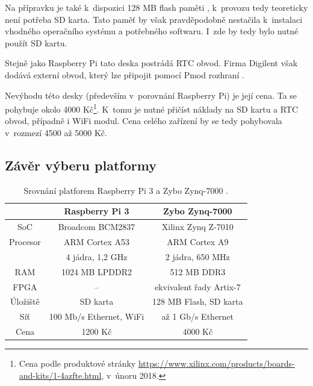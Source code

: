 Na přípravku je také k~dispozici 128 MB flash paměti \cite{zybo_man}, k~provozu tedy teoreticky není potřeba SD karta. Tato paměť by však pravděpodobně nestačila k~instalaci vhodného operačního systému a potřebného softwaru. I~zde by tedy bylo nutné použít SD kartu.

Stejně jako Raspberry Pi tato deska postrádá RTC obvod. Firma Digilent však dodává externí obvod, který lze připojit pomocí Pmod rozhraní \cite{pmod_rtc_man}. 

Nevýhodu této desky (především v~porovnání Raspberry Pi) je její cena. Ta se pohybuje okolo 4000 Kč\footnote{Cena podle produktové stránky \url{https://www.xilinx.com/products/boards-and-kits/1-4azfte.html}, v~únoru 2018.}. K~tomu je nutné přičíst náklady na SD kartu a RTC obvod, případně i WiFi modul. Cena celého zařízení by se tedy pohybovala v~rozmezí 4500 až 5000 Kč.


\subsection{Závěr výberu platformy}

\begin{table}[h!]
\centering
\begin{tabular}{|c | c | c |} 
 \hline
 & \textbf{Raspberry Pi 3} & \textbf{Zybo Zynq-7000} \\
 \hline 
 SoC & Broadcom BCM2837 & Xilinx Zynq Z-7010 \\ 
 Procesor & ARM Cortex A53 & ARM Cortex A9 \\
 & 4 jádra, 1,2 GHz & 2 jádra, 650 MHz \\
 RAM & 1024 MB LPDDR2 & 512 MB DDR3 \\
 FPGA & -- & ekvivalent řady Artix-7 \\
 Úložiště & SD karta & 128 MB Flash, SD karta \\
 Síť & 100 Mb/s Ethernet, WiFi & až 1 Gb/s Ethernet \\
 Cena & 1200 Kč & 4000 Kč \\
 \hline
\end{tabular}
\caption[Srovnání platforem Raspberry Pi 3 a Zybo Zynq-7000]{Srovnání platforem Raspberry Pi 3 a Zybo Zynq-7000 \cite{rpi_benchoff, zybo_man}.}
\label{tab:plat_compare}
\end{table}

